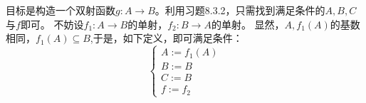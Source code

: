\documentclass{article}
\begin{document}
目标是构造一个双射函数$g: A \rightarrow B$。利用习题8.3.2，只需找到满足条件的$A,B,C$与$f$即可。
不妨设$f_1: A \rightarrow B$的单射，$f_2: B \rightarrow A$的单射。
显然，$A,f_1(A)$的基数相同，$f_1(A) \subseteq B$,于是，如下定义，即可满足条件：
\begin{equation*}
  \begin{cases*}
    A := f_1(A) \\
    B := B      \\
    C := B      \\
    f := f_2
  \end{cases*}
\end{equation*}
\end{document}
